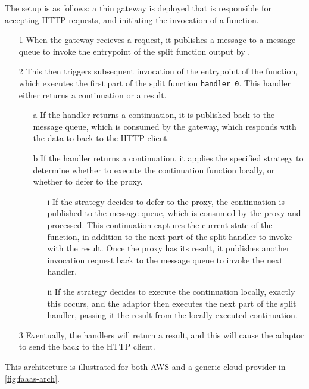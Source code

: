 The setup is as follows: a thin gateway is deployed that is responsible for accepting HTTP requests, and initiating the invocation of a function.

\begin{itemize}
\item[1] When the gateway recieves a request, it publishes a message to a message queue to invoke the entrypoint of the split function output by \faaasc{}.

\item[2] This then triggers subsequent invocation of the entrypoint of the function, which executes the first part of the split function \verb|handler_0|. This handler either returns a continuation or a result.

\begin{itemize}
\item[a] If the handler returns a continuation, it is published back to the message queue, which is consumed by the gateway, which responds with the data to back to the HTTP client.

\item[b] If the handler returns a continuation, it applies the specified strategy to determine whether to execute the continuation function locally, or whether to defer to the proxy.

\begin{itemize}
\item[i] If the strategy decides to defer to the proxy, the continuation is published to the message queue, which is consumed by the proxy and processed. This continuation captures the current state of the function, in addition to the next part of the split handler to invoke with the result. Once the proxy has its result, it publishes another invocation request back to the message queue to invoke the next handler.

\item[ii] If the strategy decides to execute the continuation locally, exactly this occurs, and the adaptor then executes the next part of the split handler, passing it the result from the locally executed continuation.
\end{itemize}
\end{itemize}

\item[3] Eventually, the handlers will return a result, and this will cause the adaptor to send the back to the HTTP client.
\end{itemize}

This architecture is illustrated for both AWS and a generic cloud provider in \ref{fig:faaas-arch}.

